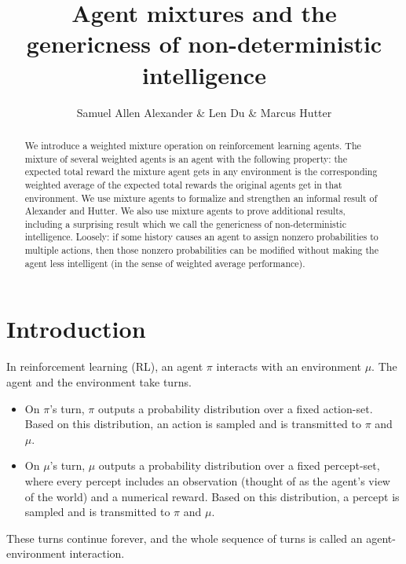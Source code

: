 \documentclass[twoside]{article}
\begin{document}

 \title{Agent mixtures and the genericness of non-deterministic intelligence}
\author{Samuel Allen Alexander \& Len Du \& Marcus Hutter}


\maketitle

\begin{abstract}
    We introduce a weighted mixture operation on
    reinforcement learning agents. The mixture of several weighted agents is
    an agent with the
    following property: the expected total reward the mixture agent
    gets in any environment is the corresponding weighted average
    of the expected total rewards the original agents get in that
    environment. We use mixture agents to formalize and
    strengthen an informal result of Alexander and Hutter. We also use mixture
    agents to prove additional results, including a surprising result
    which we call the genericness of non-deterministic intelligence. Loosely:
    if some history causes an agent to assign nonzero probabilities to multiple
    actions, then those nonzero probabilities can be modified without making
    the agent less intelligent (in the sense of weighted average performance).
\end{abstract}

\section{Introduction}

In reinforcement learning (RL), an agent $\pi$ interacts with an environment $\mu$.
The agent and the environment take turns.
\begin{itemize}
\item
On $\pi$'s turn, $\pi$
outputs a probability distribution over a fixed action-set.
Based on this distribution, an action is sampled
and is transmitted to $\pi$ and $\mu$.
\item
On $\mu$'s turn, $\mu$
outputs a probability distribution over a fixed percept-set,
where every percept includes an observation (thought of as
the agent's view of the world) and a numerical reward.
Based on this distribution, a percept is sampled and
is transmitted to $\pi$ and $\mu$.
\end{itemize}
These turns continue forever, and the whole sequence of turns
is called an agent-environment interaction.
\end{document}
